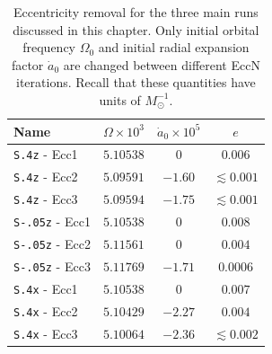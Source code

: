 \begin{table}
\centering
\begin{tabular} {l | l | c | c}
Name & $\Omega\times10^{3}$ & $\dot{a}_0\times10^{5}$ & $e$
\\ \hline {\tt S.4z} - Ecc1 & $5.10538$ & $0$ & $0.006$ \\ {\tt S.4z} - Ecc2 &
$5.09591$ & $-1.60$ & $\lesssim 0.001$ \\ {\tt S.4z} - Ecc3 & $5.09594$ &
$-1.75$ & $\lesssim 0.001$ \\ \hline {\tt S-.05z} - Ecc1 & $5.10538$ & $0$ &
$0.008$ \\ {\tt S-.05z} - Ecc2 & $5.11561$ & $0$ & $0.004$ \\ {\tt S-.05z} - Ecc3
& $5.11769$ & $-1.71$ & $0.0006$ \\\hline {\tt S.4x} - Ecc1 & $5.10538$ &
$0$ & $0.007$ \\ {\tt S.4x} - Ecc2 & $5.10429$ & $-2.27$ & $0.004$ \\ {\tt S.4x} -
Ecc3 & $5.10064$ & $-2.36$ & $\lesssim 0.002$ \\
\end{tabular}
\caption[Eccentricity removal data for our three main runs.]{\label{tab:ecc_removal} Eccentricity removal for the three
  main runs discussed in this chapter. Only initial orbital frequency
  $\Omega_0$ and initial radial expansion factor $\dot a_0$ are
  changed between different EccN iterations. Recall that these
  quantities have units of $M_{\odot}^{-1}$.}
\end{table}


